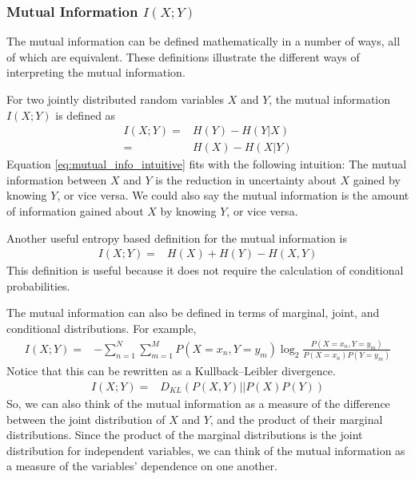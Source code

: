 \documentclass[a4paper,12pt]{article}
\theoremstyle{definition}
\begin{document}
        \subsubsection{Mutual Information $I(X;Y)$}
        The mutual information can be defined mathematically in a number of ways, all of which are equivalent. These definitions illustrate the different ways of interpreting the mutual information.

        For two jointly distributed random variables $X$ and $Y$, the mutual information $I(X;Y)$ is defined as
        \begin{align}\label{eq:mutual_info_intuitive}
            I(X;Y)  =& H(Y) - H(Y|X) \\
                    =& H(X) - H(X|Y)
        \end{align}
        Equation \ref{eq:mutual_info_intuitive} fits with the following intuition: The mutual information between $X$ and $Y$ is the reduction in uncertainty about $X$ gained by knowing $Y$, or vice versa. We could also say the mutual information is the amount of information gained about $X$ by knowing $Y$, or vice versa.

        Another useful entropy based definition for the mutual information is
        \begin{align}\label{eq:mutual_info_useful}
            I(X;Y)  =& H(X) + H(Y) - H(X,Y)
        \end{align}
        This definition is useful because it does not require the calculation of conditional probabilities.

        The mutual information can also be defined in terms of marginal, joint, and conditional distributions. For example,
        \begin{align}\label{eq:mutual_info_log}
            I(X;Y)  =& -\sum_{n=1}^N \sum_{m=1}^M P(X=x_n, Y=y_m) \log _2 \frac{P(X=x_n, Y=y_m)}{P(X=x_n) P(Y=y_m)}
        \end{align}
        Notice that this can be rewritten as a Kullback–Leibler divergence.
        \begin{align}
            I(X;Y)  =& D_{KL}(P(X,Y)|| P(X)P(Y))
        \end{align}
        So, we can also think of the mutual information as a measure of the difference between the joint distribution of $X$ and $Y$, and the product of their marginal distributions. Since the product of the marginal distributions is the joint distribution for independent variables, we can think of the mutual information as a measure of the variables' dependence on one another.
\end{document}
